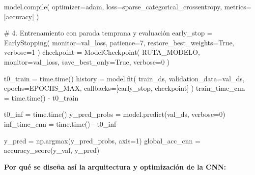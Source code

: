 \documentclass[
  spanish,
  us-letterpaper,
]{scrreprt}
\newenvironment{Shaded}{\begin{snugshade}}{\end{snugshade}}
\newcommand{\BuiltInTok}[1]{\textcolor[rgb]{0.00,0.23,0.31}{#1}}
\newcommand{\CommentTok}[1]{\textcolor[rgb]{0.37,0.37,0.37}{#1}}
\newcommand{\DecValTok}[1]{\textcolor[rgb]{0.68,0.00,0.00}{#1}}
\newcommand{\NormalTok}[1]{\textcolor[rgb]{0.00,0.23,0.31}{#1}}
\newcommand{\OperatorTok}[1]{\textcolor[rgb]{0.37,0.37,0.37}{#1}}
\newcommand{\StringTok}[1]{\textcolor[rgb]{0.13,0.47,0.30}{#1}}
\newcommand{\VariableTok}[1]{\textcolor[rgb]{0.07,0.07,0.07}{#1}}
\theoremstyle{definition}
\theoremstyle{remark}
\begin{document}
\begin{Shaded}
\begin{Highlighting}[]
\NormalTok{model.}\BuiltInTok{compile}\NormalTok{(}
\NormalTok{    optimizer}\OperatorTok{=}\StringTok{\textquotesingle{}adam\textquotesingle{}}\NormalTok{,}
\NormalTok{    loss}\OperatorTok{=}\StringTok{\textquotesingle{}sparse\_categorical\_crossentropy\textquotesingle{}}\NormalTok{,}
\NormalTok{    metrics}\OperatorTok{=}\NormalTok{[}\StringTok{\textquotesingle{}accuracy\textquotesingle{}}\NormalTok{]}
\NormalTok{)}

\CommentTok{\# 4. Entrenamiento con parada temprana y evaluación}
\NormalTok{early\_stop }\OperatorTok{=}\NormalTok{ EarlyStopping(}
\NormalTok{    monitor}\OperatorTok{=}\StringTok{\textquotesingle{}val\_loss\textquotesingle{}}\NormalTok{, patience}\OperatorTok{=}\DecValTok{7}\NormalTok{, restore\_best\_weights}\OperatorTok{=}\VariableTok{True}\NormalTok{, verbose}\OperatorTok{=}\DecValTok{1}
\NormalTok{)}
\NormalTok{checkpoint }\OperatorTok{=}\NormalTok{ ModelCheckpoint(}
\NormalTok{    RUTA\_MODELO, monitor}\OperatorTok{=}\StringTok{\textquotesingle{}val\_loss\textquotesingle{}}\NormalTok{, save\_best\_only}\OperatorTok{=}\VariableTok{True}\NormalTok{, verbose}\OperatorTok{=}\DecValTok{0}
\NormalTok{)}

\NormalTok{t0\_train }\OperatorTok{=}\NormalTok{ time.time()}
\NormalTok{history }\OperatorTok{=}\NormalTok{ model.fit(}
\NormalTok{    train\_ds,}
\NormalTok{    validation\_data}\OperatorTok{=}\NormalTok{val\_ds,}
\NormalTok{    epochs}\OperatorTok{=}\NormalTok{EPOCHS\_MAX,}
\NormalTok{    callbacks}\OperatorTok{=}\NormalTok{[early\_stop, checkpoint]}
\NormalTok{)}
\NormalTok{train\_time\_cnn }\OperatorTok{=}\NormalTok{ time.time() }\OperatorTok{{-}}\NormalTok{ t0\_train}

\NormalTok{t0\_inf }\OperatorTok{=}\NormalTok{ time.time()}
\NormalTok{y\_pred\_probs }\OperatorTok{=}\NormalTok{ model.predict(val\_ds, verbose}\OperatorTok{=}\DecValTok{0}\NormalTok{)}
\NormalTok{inf\_time\_cnn }\OperatorTok{=}\NormalTok{ time.time() }\OperatorTok{{-}}\NormalTok{ t0\_inf}

\NormalTok{y\_pred }\OperatorTok{=}\NormalTok{ np.argmax(y\_pred\_probs, axis}\OperatorTok{=}\DecValTok{1}\NormalTok{)}
\NormalTok{global\_acc\_cnn }\OperatorTok{=}\NormalTok{ accuracy\_score(y\_val, y\_pred)}
\end{Highlighting}
\end{Shaded}

\textbf{Por qué se diseña así la arquitectura y optimización de la CNN:}
\end{document}
